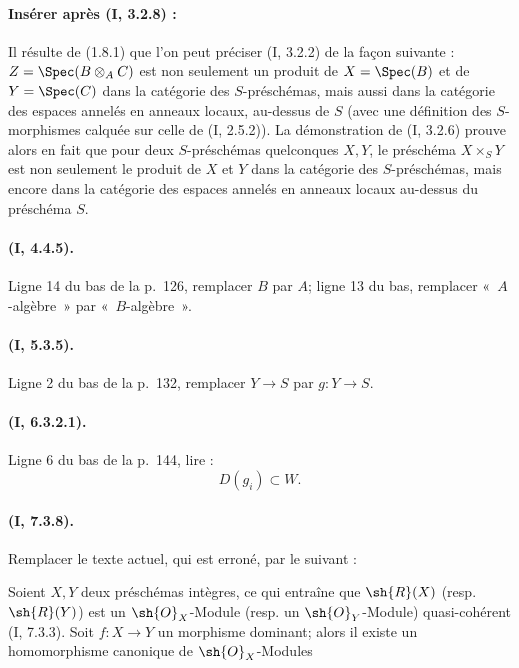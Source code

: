 \paragraph{Insérer après (I, 3.2.8) :}

\begin{env}[3.2.9]
\label{ega2:addendum:I.3.2.9-fr}
Il résulte de (1.8.1) que l'on peut préciser (I, 3.2.2) de la façon
suivante : $Z=\Spec(B\otimes_A C)$ est non seulement un produit de
$X=\Spec(B)$ et de $Y=\Spec(C)$ dans la catégorie des $S$-préschémas,
mais aussi dans la catégorie des espaces annelés en anneaux locaux,
au-dessus de $S$ (avec une définition des $S$-morphismes calquée sur
celle de (I, 2.5.2)). La démonstration de (I, 3.2.6) prouve alors en
fait que pour deux $S$-préschémas quelconques $X,Y$, le préschéma
$X\times_S Y$ est non seulement le produit de $X$ et $Y$ dans la
catégorie des $S$-préschémas, mais encore dans la catégorie des espaces
annelés en anneaux locaux au-dessus du préschéma $S$.
\end{env}

\paragraph{(I, 4.4.5).}
Ligne 14 du bas de la p.~126, remplacer $B$ par $A$; ligne 13 du bas,
remplacer «~$A$-algèbre~» par «~$B$-algèbre~».

\paragraph{(I, 5.3.5).}
Ligne 2 du bas de la p.~132, remplacer $Y\to S$ par $g:Y\to S$.

\paragraph{(I, 6.3.2.1).}
Ligne 6 du bas de la p.~144, lire :
\[
  D(g_i)\subset W.
\]

\paragraph{(I, 7.3.8).}
Remplacer le texte actuel, qui est erroné, par le suivant :

Soient $X,Y$ deux préschémas intègres, ce qui entraîne que
$\sh{R}(X)$ (resp. $\sh{R}(Y)$) est un $\sh{O}_X$-Module (resp. un
$\sh{O}_Y$-Module) quasi-cohérent (I, 7.3.3). Soit $f:X\to Y$ un
morphisme dominant; alors il existe un homomorphisme canonique de
$\sh{O}_X$-Modules

